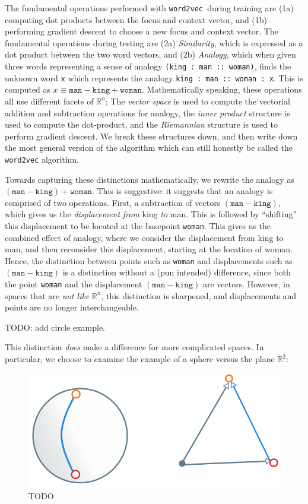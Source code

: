 \documentclass[11pt]{book}
\newcommand{\wtov}{\texttt{word2vec }}
\newcommand{\R}{\ensuremath{\mathbb R}}
\begin{document}
The fundamental operations performed with \wtov during training are
(1a) computing dot products between the focus and context vector, and (1b)
performing gradient descent to choose a new focus and context vector. The fundamental
operations during testing are (2a) \emph{Similarity}, which is
expressed as a dot product between the two word vectors, and (2b) \emph{Analogy},
which when given three words representing a sense of analogy \texttt{(king : man :: woman)},
finds the unknown word \texttt{x} which represents the analogy \texttt{king :
man :: woman : x}. This is computed as $x \equiv \texttt{man} - \texttt{king} +
\texttt{woman}$. Mathematically speaking, these operations all use
different facets of $\R^n$; The \emph{vector space} is used to compute
the vectorial addition and subtraction operations for analogy, the \emph{inner product}
structure is used to compute the dot-product, and the \emph{Riemannian} structure is used to perform
gradient descent. We break these structures down, and then write down the most
general version of the algorithm which can still honestly be called the \texttt{word2vec} algorithm.

Towards capturing these distinctions mathematically,
we rewrite the analogy as $(\texttt{man} - \texttt{king}) + \texttt{woman}$.
This is suggestive: it suggests that an analogy is comprised of two operations. First,
a subtraction of vectors $(\texttt{man}-\texttt{king})$, which gives us the \emph{displacement}
\emph{from} king \emph{to} man. This is followed by ``shifting'' this displacement to be
located at the basepoint \texttt{woman}. This gives us the combined effect of analogy, where
we consider the displacement from king to man, and then reconsider this displacement, starting
at the location of woman. Hence, the distinction between points such as \texttt{woman}
and displacements such as $(\texttt{man} - \texttt{king})$
is a distinction without a (pun intended) difference, since both the point \texttt{woman}
and the displacement $(\texttt{man} - \texttt{king})$ are vectors. However, in spaces
that are \emph{not like} $\R^n$, this distinction is sharpened, and displacements and points
are no longer interchangeable.

TODO: add circle example.


This distinction \emph{does} make a difference for more complicated spaces.
In particular, we choose to examine the example of a sphere versus the plane
$\mathbb R^2$:

\begin{figure}[htb]
\includegraphics[width=\textwidth]{figures/sphere-shortest-path.png}
\caption{TODO}
\end{figure}
\end{document}
